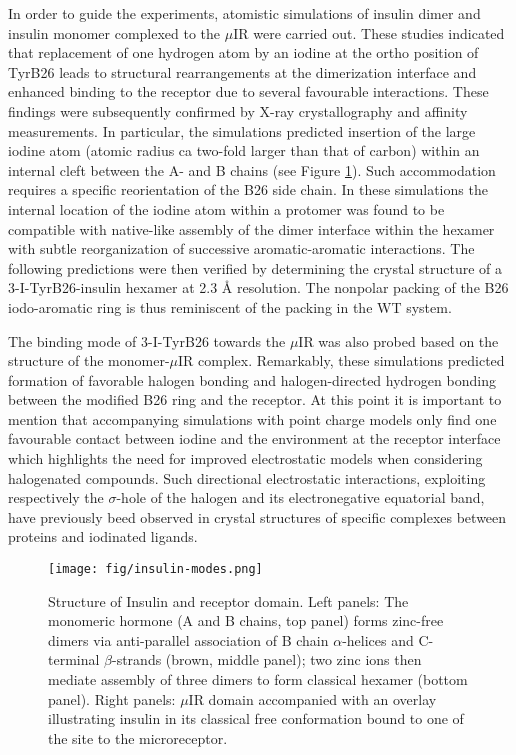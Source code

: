 \documentclass[journal=jacsat,manuscript=article]{achemso}
\begin{document}
\noindent
In order to guide the experiments, atomistic simulations of insulin
dimer and insulin monomer complexed to the $\mu$IR were carried
out. These studies indicated that replacement of one hydrogen atom by
an iodine at the ortho position of TyrB26 leads to structural
rearrangements at the dimerization interface and enhanced binding to
the receptor due to several favourable interactions. These findings
were subsequently confirmed by X-ray crystallography and affinity
measurements.\cite{insulin:2016} In particular, the simulations
predicted insertion of the large iodine atom (atomic radius ca
two-fold larger than that of carbon) within an internal cleft between
the A- and B chains (see Figure \ref{fig:insulin}). Such accommodation
requires a specific reorientation of the B26 side chain. In these
simulations the internal location of the iodine atom within a protomer
was found to be compatible with native-like assembly of the dimer
interface within the hexamer with subtle reorganization of successive
aromatic-aromatic interactions. The following predictions were then
verified by determining the crystal structure of a 3-I-TyrB26-insulin
hexamer at 2.3 \AA\/ resolution. The nonpolar packing of the B26
iodo-aromatic ring is thus reminiscent of the packing in the WT system.

\noindent
The binding mode of 3-I-TyrB26 towards the $\mu$IR was also probed
based on the structure of the monomer-$\mu$IR complex. Remarkably,
these simulations predicted formation of favorable halogen bonding and
halogen-directed hydrogen bonding between the modified B26 ring and
the receptor. At this point it is important to mention that
accompanying simulations with point charge models only find one
favourable contact between iodine and the environment at the receptor
interface which highlights the need for improved electrostatic models
when considering halogenated compounds. Such directional electrostatic
interactions, exploiting respectively the $\sigma$-hole of the halogen
and its electronegative equatorial band, have previously beed observed
in crystal structures of specific complexes between proteins and
iodinated ligands.

\begin{figure}[h]
\centering
\texttt{[image: fig/insulin-modes.png]}
\caption{Structure of Insulin and receptor domain. Left panels: The
  monomeric hormone (A and B chains, top panel) forms zinc-free dimers
  via anti-parallel association of B chain $\alpha$-helices and
  C-terminal $\beta$-strands (brown, middle panel); two zinc ions then
  mediate assembly of three dimers to form classical hexamer (bottom
  panel). Right panels: $\mu$IR domain accompanied with an overlay
  illustrating insulin in its classical free conformation bound to one
  of the site to the microreceptor.}
\label{fig:insulin}
\end{figure}
\end{document}
